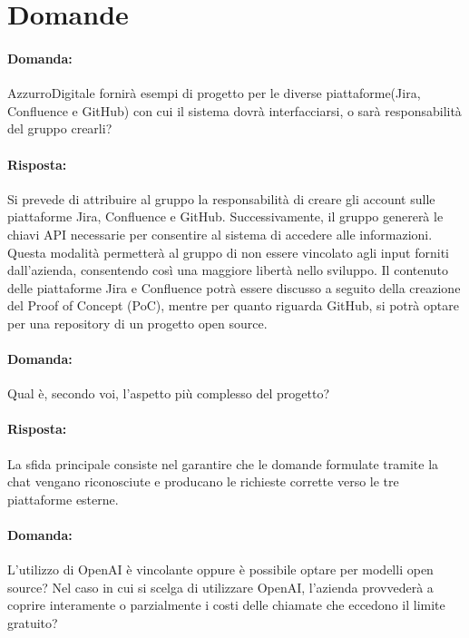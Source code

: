 \documentclass[a4paper, 12pt]{article}
\begin{document}
\section{Domande}
\paragraph{Domanda:} AzzurroDigitale fornirà esempi di progetto per le diverse piattaforme(Jira, Confluence e GitHub) con cui il sistema dovrà interfacciarsi, o sarà responsabilità del gruppo crearli?
\paragraph{Risposta:} Si prevede di attribuire al gruppo la responsabilità di creare gli account sulle piattaforme Jira, Confluence e GitHub. Successivamente, il gruppo genererà le chiavi API necessarie per consentire al sistema di accedere alle informazioni. Questa modalità permetterà al gruppo di non essere vincolato agli input forniti dall’azienda, consentendo così una maggiore libertà nello sviluppo. Il contenuto delle piattaforme Jira e Confluence potrà essere discusso a seguito della creazione del Proof of Concept (PoC), mentre per quanto riguarda GitHub, si potrà optare per una repository di un progetto open source.

\vspace{1.2cm}

\paragraph{Domanda:} Qual è, secondo voi, l’aspetto più complesso del progetto?
\paragraph{Risposta:} La sfida principale consiste nel garantire che le domande formulate tramite la chat vengano riconosciute e producano le richieste corrette verso le tre piattaforme esterne.

\vspace{1.2cm}

\paragraph{Domanda:} L’utilizzo di OpenAI è vincolante oppure è possibile optare per modelli open source? Nel caso in cui si scelga di utilizzare OpenAI, l’azienda provvederà a coprire interamente o parzialmente i costi delle chiamate che eccedono il limite gratuito?
\end{document}
